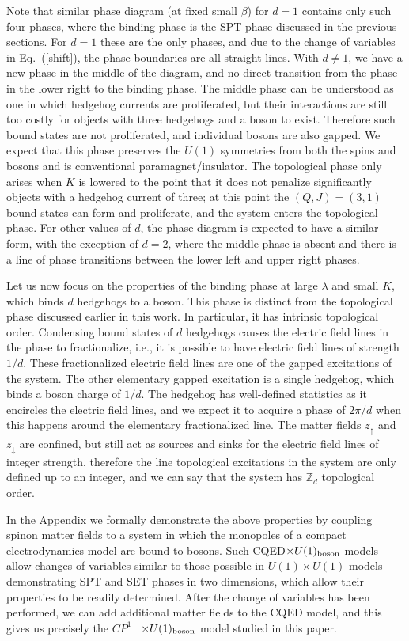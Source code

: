 \documentclass[prb,twocolumn]{revtex4-1}
\newcommand{\cp}{$CP^1$ }
\begin{document}
Note that similar phase diagram (at fixed small $\beta$) for $d=1$ contains only such four phases, where the binding phase is the SPT phase discussed in the previous sections. For $d=1$ these are the only phases, and due to the change of variables in Eq.~(\ref{shift}), the phase boundaries are all straight lines.
With $d\neq 1$, we have a new phase in the middle of the diagram, and no direct transition from the phase in the lower right to the binding phase. The middle phase can be understood as one in which hedgehog currents are proliferated, but their interactions are still too costly for objects with three hedgehogs and a boson to exist. Therefore such bound states are not proliferated, and individual bosons are also gapped.  We expect that this phase preserves the $U(1)$ symmetries from both the spins and bosons and is conventional paramagnet/insulator. The topological phase only arises when $K$ is lowered to the point that it does not penalize significantly objects with a hedgehog current of three; at this point the $(Q, J) = (3, 1)$ bound states can form and proliferate, and the system enters the topological phase. For other values of $d$, the phase diagram is expected to have a similar form, with the exception of $d=2$, where the middle phase is absent and there is a line of phase transitions between the lower left and upper right phases.

Let us now focus on the properties of the binding phase at large $\lambda$ and small $K$, which binds $d$ hedgehogs to a boson. This phase is distinct from the topological phase discussed earlier in this work. In particular, it has intrinsic topological order. Condensing bound states of $d$ hedgehogs causes the electric field lines in the phase to fractionalize, i.e., it is possible to have electric field lines of strength $1/d$. These fractionalized electric field lines are one of the gapped excitations of the system. The other elementary gapped excitation is a single hedgehog, which binds a boson charge of $1/d$. The hedgehog has well-defined statistics as it encircles the electric field lines, and we expect it to acquire a phase of $2\pi/d$ when this happens around the elementary fractionalized line. The matter fields $z_\uparrow$ and $z_\downarrow$ are confined, but still act as sources and sinks for the electric field lines of integer strength, therefore the line topological excitations in the system are only defined up to an integer, and we can say that the system has $\mathbb{Z}_d$ topological order. 

In the Appendix we formally demonstrate the above properties by coupling spinon matter fields to a system in which the monopoles of a compact electrodynamics model are bound to bosons. Such CQED$\times U(1)_{\rm boson}$ models allow changes of variables similar to those possible in $U(1)\times U(1)$ models demonstrating SPT and SET phases in two dimensions\cite{FQHE}, which allow their properties to be readily determined. After the change of variables has been performed, we can add additional matter fields to the CQED model, and this gives us precisely the \cp~$\times U(1)_{\rm boson}$ model studied in this paper.
\end{document}

